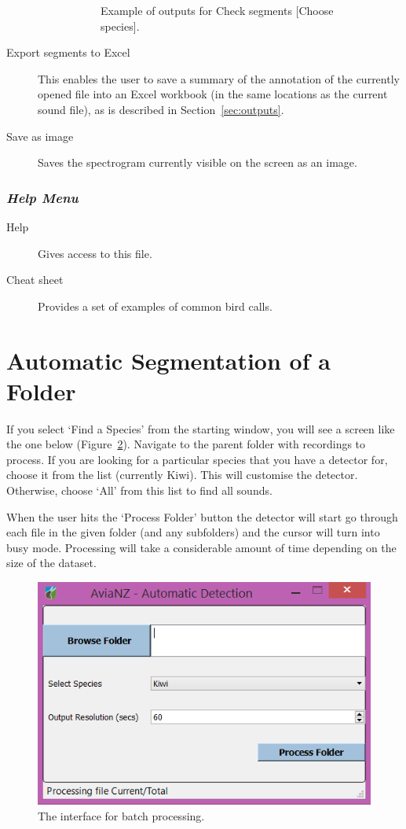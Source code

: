 \documentclass{article}
\begin{document}
\begin{description}
\begin{description}
\begin{figure}
	\caption{Example of outputs for Check segments [Choose species].}
	\label{check2}
	\end{figure}
	\end{description}

\item [Export segments to Excel] This enables the user to save a summary of the annotation of the currently opened file into an Excel workbook (in the same locations as the current sound file), as is described in Section~\ref{sec:outputs}. 
\item [Save as image] Saves the spectrogram currently visible on the screen as an image.
\end{description}

\subsubsection{{\em Help Menu}}

\begin{description}
\item [Help] Gives access to this file.
\item [Cheat sheet] Provides a set of examples of common bird calls. 
\end{description}


\section{Automatic Segmentation of a Folder}
\label{sec:auto}
If you select `Find a Species' from the starting window, you will see a screen like the one below (Figure~\ref{batch}). Navigate to the parent folder with recordings to process. If you are looking for a particular species that you have a detector for, choose it from the list (currently Kiwi). This will customise the detector. Otherwise, choose `All' from this list to find all sounds. 

When the user hits the `Process Folder' button the detector will start go through each file in the given folder (and any subfolders) and the cursor will turn into busy mode. Processing will take a considerable amount of time depending on the size of the dataset.

\begin{figure}[h!]
\centering
\includegraphics[width=.5\textwidth]{Figs/proc_folder}
\caption{The interface for batch processing.}
\label{batch}
\end{figure}
\end{document}
